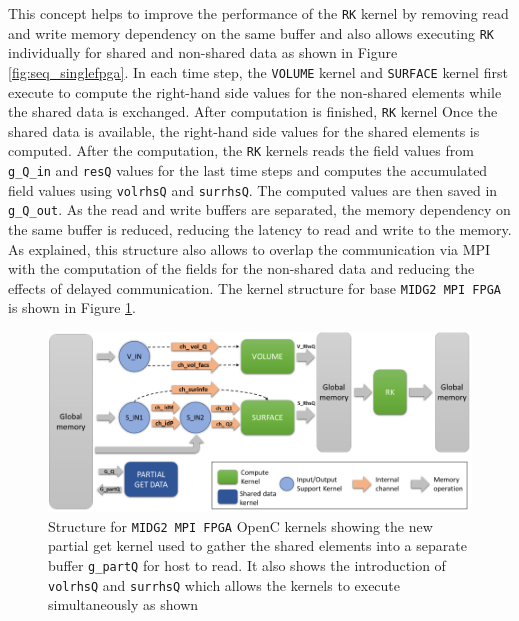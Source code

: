 This concept helps to improve the performance of the \texttt{RK} kernel
by removing read and write memory dependency on the same buffer and also allows executing
\texttt{RK} individually for shared and non-shared data as shown in Figure \ref{fig:seq_singlefpga}.
In each time step, the \texttt{VOLUME} kernel and \texttt{SURFACE} kernel first execute to compute the right-hand side values for the
non-shared elements while the shared data is exchanged. After computation is finished, \texttt{RK} kernel Once the shared data is available,
the right-hand side values for the shared elements is computed. After the computation,
the \texttt{RK} kernels reads the field values from \texttt{g\_Q\_in} and \texttt{resQ} values
for the last time steps and computes the accumulated field values using
\texttt{volrhsQ} and \texttt{surrhsQ}. The computed values are then saved in \texttt{g\_Q\_out}.
As the read and write buffers are separated, the memory dependency on the same buffer is reduced,
reducing the latency to read and write to the memory. As explained, this structure also allows
to overlap the communication via MPI with the computation of the fields for the non-shared data
and reducing the effects of delayed communication. The kernel structure for base \texttt{MIDG2 MPI FPGA}
is shown in Figure \ref{fig:base_kernstruc}.
\begin{figure}[ht]%
    \centering
    \includegraphics[width=1.0\textwidth]{images/base_kernstruc}
    \caption{Structure for \texttt{MIDG2 MPI FPGA} OpenC kernels showing the new partial get kernel used to gather
     the shared elements into a separate buffer \texttt{g\_partQ} for host to read. It also shows the introduction
     of \texttt{volrhsQ} and \texttt{surrhsQ} which allows the kernels to execute simultaneously as shown}
    \label{fig:base_kernstruc}
\end{figure}
